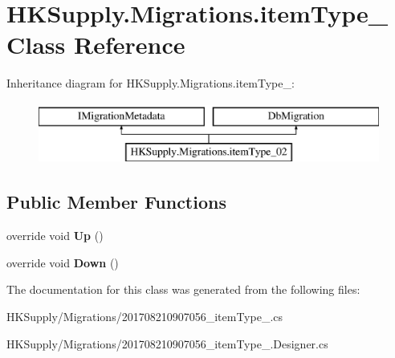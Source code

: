 \hypertarget{class_h_k_supply_1_1_migrations_1_1item_type__02}{}\section{H\+K\+Supply.\+Migrations.\+item\+Type\+\_ Class Reference}
\label{class_h_k_supply_1_1_migrations_1_1item_type__02}
Inheritance diagram for H\+K\+Supply.\+Migrations.\+item\+Type\+\_\+:\begin{figure}[H]
\begin{center}
\leavevmode
\includegraphics[height=2.000000cm]{class_h_k_supply_1_1_migrations_1_1item_type__02}
\end{center}
\end{figure}
\subsection*{Public Member Functions}
\begin{DoxyCompactItemize}
\item 
\mbox{\label{class_h_k_supply_1_1_migrations_1_1item_type__02_afadcf01ed88230c0801e3c8d4dd75b7d}} 
override void {\bfseries Up} ()
\item 
\mbox{\label{class_h_k_supply_1_1_migrations_1_1item_type__02_a7b8017bcec76c5d921cb63aa1c1d045f}} 
override void {\bfseries Down} ()
\end{DoxyCompactItemize}


The documentation for this class was generated from the following files\+:\begin{DoxyCompactItemize}
\item 
H\+K\+Supply/\+Migrations/201708210907056\+\_\+item\+Type\+\_.\+cs\item 
H\+K\+Supply/\+Migrations/201708210907056\+\_\+item\+Type\+\_.\+Designer.\+cs\end{DoxyCompactItemize}
